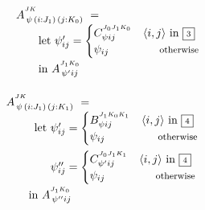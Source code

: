 \begin{equation}\LeftEqNo
\renewcommand\arraystretch{1.5}
\begin{array}{l@{}l}
	A^{^{JK}}_{\,\psi\,(i : J_1)\,(j : K_0)} ~=~ \\
	\qquad
	\textrm{let}~\psi'_{ij} = \begin{cases}
	  C^{^{J_0J_1K_0}}_{\psi ij} & \langle i,j\rangle\mbox{ in }\qbox3 \\
	  \psi_{ij} & \otherwise
	\end{cases} \\
	\qquad\textrm{in}~
	A^{^{J_1K_0}}_{\,\psi' ij}
\end{array}
\label{intro:let in A 3 using C}
\end{equation}

\begin{equation}\LeftEqNo
\renewcommand\arraystretch{1.5}
\begin{array}{l@{}l}
	\lspan2{A^{^{JK}}_{\,\psi\,(i : J_1)\,(j : K_1)} ~=~} \\
	\qquad
	\textrm{let}~ & \psi'_{ij} = \begin{cases}
	  B^{^{J_1K_0K_1}}_{\psi ij} & \langle i,j\rangle\mbox{ in }\qbox4 \\
	  \psi_{ij} & \otherwise
	\end{cases} \\[1.2em]
	& \psi''_{ij} = \begin{cases}
	  C^{^{J_0J_1K_1}}_{\psi' ij} & \langle i,j\rangle\mbox{ in }\qbox4 \\
	  \psi_{ij} & \otherwise
	\end{cases} \\
	\lspan2{
	\qquad\textrm{in}~A^{^{J_1K_0}}_{\,\psi'' ij}
	}
\end{array}
\label{intro:let in A 4 using B,C}
\end{equation}

